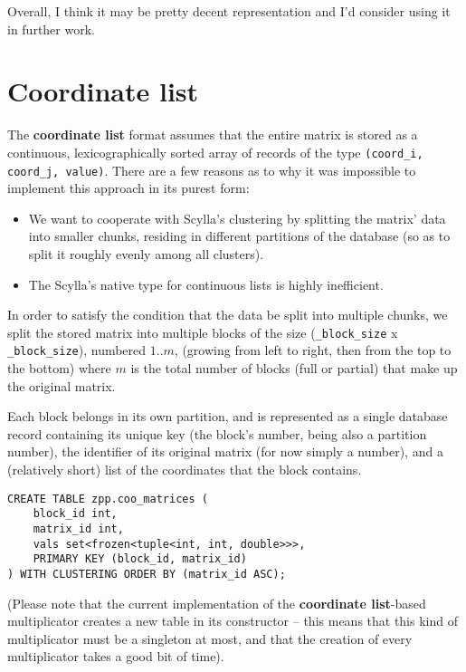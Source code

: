 \documentclass{article}
\newcommand{\code}[0]{\texttt}
\begin{document}
Overall, I think it may be pretty decent representation and I'd consider using it in further work.
\pagebreak
\section{Coordinate list}

The \textbf{coordinate list} format assumes that the entire matrix is stored as a continuous, lexicographically sorted array of records of the type \code{(coord\_i, coord\_j, value)}. There are a few reasons as to why it was impossible to implement this approach in its purest form:

\begin{itemize}
\item We want to cooperate with Scylla's clustering by splitting the matrix' data into smaller chunks, residing in different partitions of the database (so as to split it roughly evenly among all clusters).
\item The Scylla's native type for continuous lists is highly inefficient.
\end{itemize}

In order to satisfy the condition that the data be split into multiple chunks, we split the stored matrix into multiple blocks of the size (\code{\_block\_size} x \code{\_block\_size}), numbered $1..m$, (growing from left to right, then from the top to the bottom) where $m$ is the total number of blocks (full or partial) that make up the original matrix. 

Each block belongs in its own partition, and is represented as a single database record containing its unique key (the block's number, being also a partition number), the identifier of its original matrix (for now simply a number), and a (relatively short) list of the coordinates that the block contains.

\begin{lstlisting}[style=SQLStyle]
CREATE TABLE zpp.coo_matrices (
    block_id int, 
    matrix_id int, 
    vals set<frozen<tuple<int, int, double>>>, 
    PRIMARY KEY (block_id, matrix_id) 
) WITH CLUSTERING ORDER BY (matrix_id ASC);
\end{lstlisting}

(Please note that the current implementation of the \textbf{coordinate list}-based multiplicator creates a new table in its constructor -- this means that this kind of multiplicator must be a singleton at most, and that the creation of every multiplicator takes a good bit of time).
\end{document}
